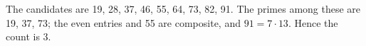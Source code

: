 The candidates are 19, 28, 37, 46, 55, 64, 73, 82, 91. The primes among these are 19, 37, 73; the even entries and 55 are composite, and $ 91=7\cdot13 $. Hence the count is $\boxed3 $.
